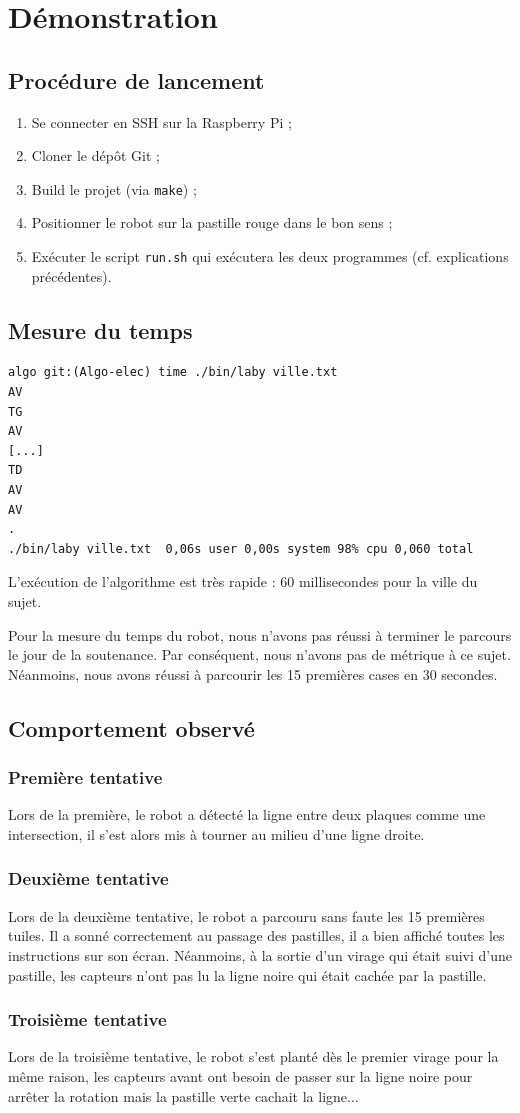 \chapter{Démonstration}

\section{Procédure de lancement}
\begin{enumerate}
    \item Se connecter en SSH sur la Raspberry Pi ;
    \item Cloner le dépôt Git ;
    \item Build le projet (via \texttt{make}) ;
    \item Positionner le robot sur la pastille rouge dans le bon sens ;
    \item Exécuter le script \texttt{run.sh} qui exécutera les deux programmes (cf. explications précédentes).
\end{enumerate}

\section{Mesure du temps}

\begin{verbatim}
algo git:(Algo-elec) time ./bin/laby ville.txt
AV
TG
AV
[...]
TD
AV
AV
.
./bin/laby ville.txt  0,06s user 0,00s system 98% cpu 0,060 total
\end{verbatim}
L'exécution de l'algorithme est très rapide : 60 millisecondes pour la ville du sujet.

Pour la mesure du temps du robot, nous n'avons pas réussi à terminer le parcours le jour de la soutenance. Par conséquent, nous n'avons pas de métrique à ce sujet. Néanmoins, nous avons réussi à parcourir les 15 premières cases en 30 secondes.

\section{Comportement observé}

\subsection{Première tentative}
Lors de la première, le robot a détecté la ligne entre deux plaques comme une intersection, il s'est alors mis à tourner au milieu d'une ligne droite.

\subsection{Deuxième tentative}
Lors de la deuxième tentative, le robot a parcouru sans faute les 15 premières tuiles. Il a sonné correctement au passage des pastilles, il a bien affiché toutes les instructions sur son écran. Néanmoins, à la sortie d'un virage qui était suivi d'une pastille, les capteurs n'ont pas lu la ligne noire qui était cachée par la pastille.

\subsection{Troisième tentative}
Lors de la troisième tentative, le robot s'est planté dès le premier virage pour la même raison, les capteurs avant ont besoin de passer sur la ligne noire pour arrêter la rotation mais la pastille verte cachait la ligne...

